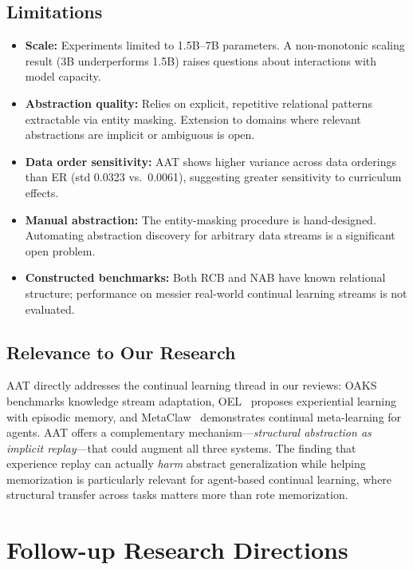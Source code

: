 \documentclass[11pt]{article}
\begin{document}
\subsection{Limitations}

\begin{itemize}
    \item \textbf{Scale:} Experiments limited to 1.5B--7B parameters. A non-monotonic scaling result (3B underperforms 1.5B) raises questions about interactions with model capacity.
    \item \textbf{Abstraction quality:} Relies on explicit, repetitive relational patterns extractable via entity masking. Extension to domains where relevant abstractions are implicit or ambiguous is open.
    \item \textbf{Data order sensitivity:} AAT shows higher variance across data orderings than ER (std 0.0323 vs.\ 0.0061), suggesting greater sensitivity to curriculum effects.
    \item \textbf{Manual abstraction:} The entity-masking procedure is hand-designed. Automating abstraction discovery for arbitrary data streams is a significant open problem.
    \item \textbf{Constructed benchmarks:} Both RCB and NAB have known relational structure; performance on messier real-world continual learning streams is not evaluated.
\end{itemize}

\subsection{Relevance to Our Research}

AAT directly addresses the continual learning thread in our reviews: OAKS~\cite{oaks} benchmarks knowledge stream adaptation, OEL~\cite{oel} proposes experiential learning with episodic memory, and MetaClaw~\cite{metaclaw} demonstrates continual meta-learning for agents. AAT offers a complementary mechanism---\textit{structural abstraction as implicit replay}---that could augment all three systems. The finding that experience replay can actually \textit{harm} abstract generalization while helping memorization is particularly relevant for agent-based continual learning, where structural transfer across tasks matters more than rote memorization.

\section{Follow-up Research Directions}
\end{document}
